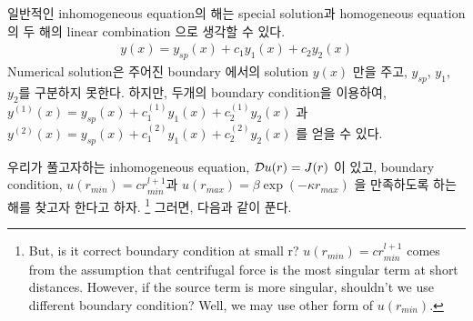 \documentclass[10pt]{article}
\newcommand{\bea}{\begin{eqnarray}}
\newcommand{\eea}{\end{eqnarray}}
\begin{document}
일반적인 inhomogeneous equation의 해는 special solution과 homogeneous equation의 
두 해의 linear combination 으로 생각할 수 있다. 
\bea 
y(x)=y_{sp}(x)+c_1 y_1(x)+c_2 y_2(x)
\eea 
Numerical solution은 주어진 boundary 에서의 solution $y(x)$ 만을 주고, 
$y_{sp}$, $y_1$, $y_2$를 구분하지 못한다.  하지만, 두개의 boundary condition을 이용하여,
$y^{(1)}(x)=y_{sp}(x)+c^{(1)}_1 y_1(x)+c^{(1)}_2 y_2(x)$
과 $y^{(2)}(x)=y_{sp}(x)+c^{(2)}_1 y_1(x)+c^{(2)}_2 y_2(x)$ 를 얻을 수 있다. 


우리가 풀고자하는 inhomogeneous equation, ${\cal D}u(r)=J(r)$ 이 있고, 
boundary condition, $u(r_{min})= c r_{min}^{l+1}$과 
$u(r_{max})= \beta \exp(-\kappa r_{max})$ 을 만족하도록 하는 해를 찾고자 한다고 하자. 
\footnote{But, is it correct boundary condition at small r? 
$u(r_{min})= c r_{min}^{l+1}$ comes from the assumption that centrifugal force
is the most singular term at short distances. However, if the source term is 
more singular, shouldn't we use different boundary condition?
Well, we may use other form of $u(r_{min})$. 
} 
그러면, 다음과 같이 푼다. 
\end{document}

